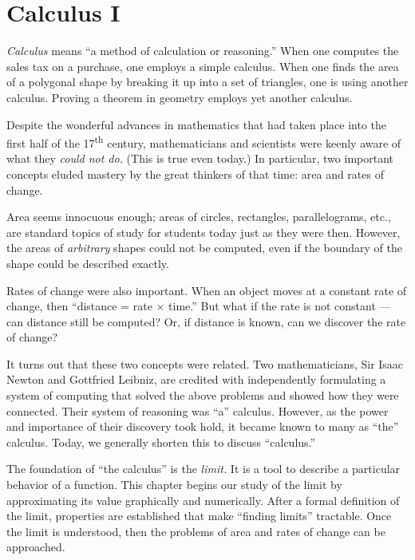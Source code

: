 \part*{Calculus I}



\textit{Calculus} means ``a method of calculation or reasoning.'' When one computes the sales tax on a purchase, one employs a simple calculus. When one finds the area of a polygonal shape by breaking it up into a set of triangles, one is using another calculus. Proving a theorem in geometry employs yet another calculus.

Despite the wonderful advances in mathematics that had taken place into the first half of the 17\textsuperscript{th} century, mathematicians and scientists were keenly aware of what they \textit{could not do.} (This is true even today.) In particular, two important concepts eluded mastery by the great thinkers of that time: area and rates of change. 

Area seems innocuous enough; areas of circles, rectangles, parallelograms, etc., are standard topics of study for students today just as they were then. However, the areas of \textit{arbitrary} shapes could not be computed, even if the boundary of the shape could be described exactly. 

Rates of change were also important. When an object moves at a constant rate of change, then ``distance = rate $\times$ time.'' But what if the rate is not constant --- can distance still be computed? Or, if distance is known, can we discover the rate of change?

It turns out that these two concepts were related. Two mathematicians, Sir Isaac Newton and Gottfried Leibniz, are credited with independently formulating a system of computing that solved the above problems and showed how they were connected. Their system of reasoning was ``a'' calculus. However, as the power and importance of their discovery took hold, it became known to many as ``the'' calculus. Today, we generally shorten this to discuss ``calculus.''

The foundation of ``the calculus'' is the \textit{limit.} It is a tool to describe a particular behavior of a function. This chapter begins our study of the limit by approximating its value graphically and numerically. After a formal definition of the limit, properties are established that make ``finding limits'' tractable. Once the limit is understood, then the problems of area and rates of change can be approached.

